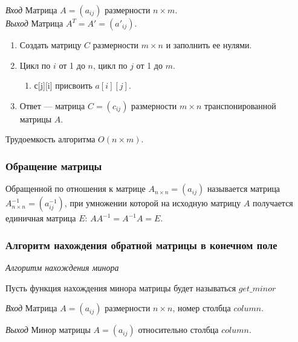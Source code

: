 \documentclass[bachelor, och, labwork]{shiza}
\begin{document}
\textit{Вход} Матрица $A = (a_{ij})$ размерности $n \times m$.\\

\textit{Выход} Матрица $A^T = A' = (a'_{ij})$.\\

\begin{enumerate}
    \item Создать матрицу $C$ размерности $m\times n$ и заполнить ее нулями.
    \item Цикл по $i$ от 1 до $n$, цикл по $j$ от 1 до $m$.
    \begin{enumerate}
        \item с[j][i] присвоить $a[i][j]$.
    \end{enumerate}
    \item Ответ --- матрица $C=(c_{ij})$ размерности $m\times n$ транспонированной матрицы $A$.
\end{enumerate}

Трудоемкость алгоритма $O(n \times m)$.

\subsubsection{Обращение матрицы}

Обращенной по отношения к матрице  $A_{n\times n}=(a_{ij})$ называется матрица 
$A^{-1}_{n\times n}=(a^{-1}_{ij})$, при умножении которой на исходную матрицу 
$A$ получается единичная матрица $E$: $AA^{-1}=A^{-1}A=E$.

\subsubsection{Алгоритм нахождения обратной матрицы в конечном поле}

\begin{center}
    \textit{Алгоритм нахождения минора}
\end{center}

Пусть функция нахождения минора матрицы будет называться $get\_minor$

\textit{Вход} Матрица $A = (a_{ij})$ размерности $n \times n$, номер столбца $column$.

\textit{Выход} Минор матрицы $A = (a_{ij})$ относительно столбца $column$.\\
\end{document}
